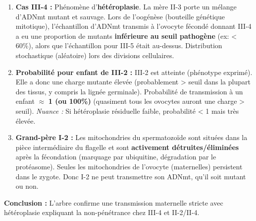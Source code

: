 \documentclass[11pt]{article}
\begin{document}
\begin{exoresolu}
\begin{enumerate}
\begin{itemize}
                  \item II-1 (femme atteinte) transmet à \textbf{tous} ses enfants (III-1, III-2) $\to$ Cohérent.
                  \item II-3 (femme atteinte) transmet à sa fille (III-5) mais pas à son fils (III-4) $\to$ Possible par hétéroplasie (voir q2).
                  \item II-4 (homme sain, fils d'atteinte) $\times$ Femme saine $\to$ Enfant (III-6) sain. \textbf{Preuve clé :} Un homme ne transmet pas l'ADNmt. Si c'était autosomique dominant, II-4 aurait 50\% de chance de transmettre l'allèle mutant. Ici 0\% de transmission $\to$ Exclut l'autosomique dominant. Compatible mitochondrial.
                  \item II-2 (femme saine) $\to$ Enfant sain. Cohérent.
              \end{itemize}
        \item \textbf{Cas III-4 :} Phénomène d'\textbf{hétéroplasie}. La mère II-3 porte un mélange d'ADNmt mutant et sauvage. Lors de l'oogénèse (bouteille génétique mitotique), l'échantillon d'ADNmt transmis à l'ovocyte fécondé donnant III-4 a eu une proportion de mutants \textbf{inférieure au seuil pathogène} (ex: < 60\%), alors que l'échantillon pour III-5 était au-dessus. Distribution stochastique (aléatoire) lors des divisions cellulaires.
        \item \textbf{Probabilité pour enfant de III-2 :} III-2 est atteinte (phénotype exprimé). Elle a donc une charge mutante élevée (probablement > seuil dans la plupart des tissus, y compris la lignée germinale). Probabilité de transmission à un enfant $\approx$ \textbf{1 (ou 100\%)} (quasiment tous les ovocytes auront une charge > seuil). \emph{Nuance :} Si hétéroplasie résiduelle faible, probabilité < 1 mais très élevée.
        \item \textbf{Grand-père I-2 :} Les mitochondries du spermatozoïde sont situées dans la pièce intermédiaire du flagelle et sont \textbf{activement détruites/éliminées} après la fécondation (marquage par ubiquitine, dégradation par le protéasome). Seules les mitochondries de l'ovocyte (maternelles) persistent dans le zygote. Donc I-2 ne peut transmettre son ADNmt, qu'il soit mutant ou non.
    \end{enumerate}
    \textbf{Conclusion :} L'arbre confirme une transmission maternelle stricte avec hétéroplasie expliquant la non-pénétrance chez III-4 et II-2/II-4.
\end{exoresolu}
\end{document}
